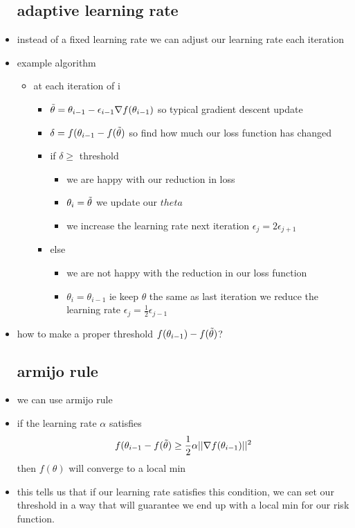\documentclass{article}
\begin{document}
\begin{itemize}
\subsection{adaptive learning rate}
\item instead of a fixed learning rate we can adjust our learning rate each iteration 
\item example algorithm 
\begin{itemize}
    \item at each iteration of i 
    \begin{itemize}
        \item $\Tilde{\theta}=\theta_{i-1}-\epsilon_{i-1}\nabla f(\theta_{i-1})$ so typical gradient descent update 
        \item $\delta=f(\theta_{i-1}-f(\Tilde{\theta})$ so find how much our loss function has changed 
        \item if $\delta\geq $ threshold
        \begin{itemize}
            \item we are happy with our reduction in loss 
            \item $\theta_i=\Tilde{\theta}$ we update our $theta$
            \item we increase the learning rate next iteration $\epsilon_{j}=2\epsilon_{j+1}$
        \end{itemize}
        \item else
        \begin{itemize}
            \item we are not happy with the reduction in our loss function 
            \item $\theta_{i}=\theta_{i-1}$ ie keep $\theta$ the same as last iteration
            \itme we reduce the learning rate $\epsilon_{j}=\frac{1}{2}\epsilon_{j-1}$
        \end{itemize}
    \end{itemize}
\end{itemize}
\item how to make a proper threshold $f(\theta_{i-1})-f(\Tilde{\theta})$?
\subsection{armijo rule}
\item we can use  armijo rule 
\item  if the learning rate $\alpha$ satisfies $$f(\theta_{i-1}-f(\Tilde{\theta})\geq \frac{1}{2}\alpha||\nabla f(\theta_{i-1})||^2$$ then $f(\theta)$ will converge to a local min
\item this tells us that if our learning rate satisfies this condition, we can set our threshold in a way that will guarantee  we end up with a local min for our risk function. 

\end{itemize}
\end{document}
